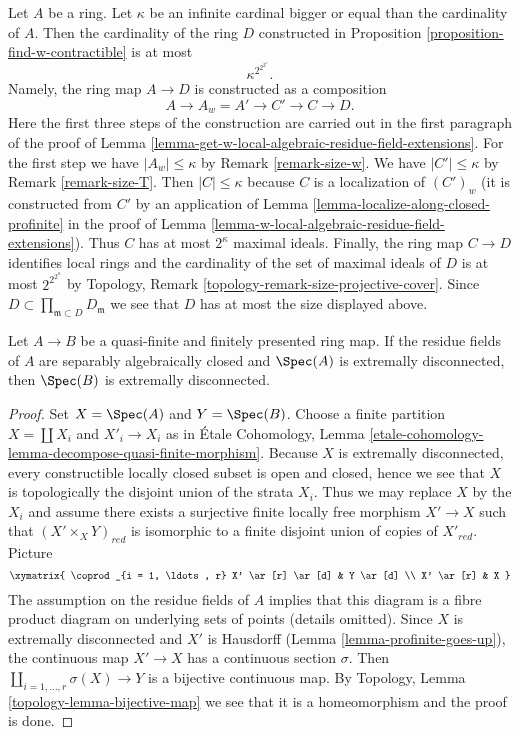 \begin{remark}
\label{remark-size-w-contractible}
Let $A$ be a ring. Let $\kappa$ be an infinite cardinal bigger or
equal than the cardinality of $A$. Then the cardinality of the
ring $D$ constructed in Proposition \ref{proposition-find-w-contractible}
is at most
$$
\kappa^{2^{2^{2^\kappa}}}.
$$
Namely, the ring map $A \to D$ is
constructed as a composition
$$
A \to A_w = A' \to C' \to C \to D.
$$
Here the first three steps of the construction are carried out
in the first paragraph of the proof of
Lemma \ref{lemma-get-w-local-algebraic-residue-field-extensions}.
For the first step we have $|A_w| \leq \kappa$ by
Remark \ref{remark-size-w}.
We have $|C'| \leq \kappa$ by
Remark \ref{remark-size-T}.
Then $|C| \leq \kappa$ because $C$ is a localization of $(C')_w$
(it is constructed from $C'$ by an application of
Lemma \ref{lemma-localize-along-closed-profinite}
in the proof of Lemma \ref{lemma-w-local-algebraic-residue-field-extensions}).
Thus $C$ has at most $2^\kappa$ maximal ideals.
Finally, the ring map $C \to D$ identifies local rings and the
cardinality of the set of maximal ideals of $D$ is at most
$2^{2^{2^\kappa}}$ by
Topology, Remark \ref{topology-remark-size-projective-cover}.
Since $D \subset \prod_{\mathfrak m \subset D} D_\mathfrak m$ we see
that $D$ has at most the size displayed above.
\end{remark}

\begin{lemma}
\label{lemma-finite-finitely-presented-over-extremally-disconnected}
Let $A \to B$ be a quasi-finite and finitely presented ring map.
If the residue fields of $A$ are separably algebraically closed
and $\Spec(A)$ is extremally disconnected, then $\Spec(B)$ is
extremally disconnected.
\end{lemma}

\begin{proof}
Set $X = \Spec(A)$ and $Y = \Spec(B)$. Choose a finite partition
$X = \coprod X_i$ and $X'_i \to X_i$ as in
\'Etale Cohomology, Lemma
\ref{etale-cohomology-lemma-decompose-quasi-finite-morphism}.
Because $X$ is extremally disconnected, every constructible
locally closed subset is open and closed, hence we see that $X$
is topologically the disjoint union of the strata $X_i$. Thus we may
replace $X$ by the $X_i$ and assume there exists a surjective finite
locally free morphism $X' \to X$ such that $(X' \times_X Y)_{red}$
is isomorphic to a finite disjoint union of copies of $X'_{red}$.
Picture
$$
\xymatrix{
\coprod_{i = 1, \ldots, r} X' \ar[r] \ar[d] & Y \ar[d] \\
X' \ar[r] & X
}
$$
The assumption on the residue fields of $A$ implies that
this diagram is a fibre product diagram on underlying sets
of points (details omitted).
Since $X$ is extremally disconnected and $X'$ is Hausdorff
(Lemma \ref{lemma-profinite-goes-up}), the continuous map
$X' \to X$ has a continuous section $\sigma$. Then
$\coprod_{i = 1, \ldots, r} \sigma(X) \to Y$ is a bijective
continuous map. By
Topology, Lemma \ref{topology-lemma-bijective-map}
we see that it is a homeomorphism and the proof is done.
\end{proof}

